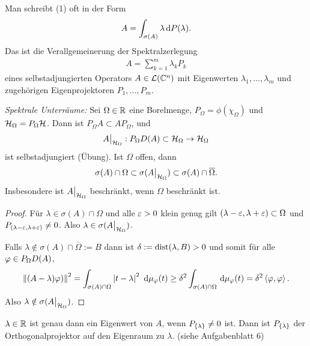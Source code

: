 \begin{bem*}[Bemerkungen.]
\begin{bemenum}
\item Man schreibt (1) oft in der Form
\begin{align*}
A = \int_{\sigma(A)} \lambda \,\mathrm{d} P(\lambda).
\end{align*}
Das ist die Verallgemeinerung der Spektralzerlegung
\begin{align*}
A = \sum_{k=1}^m \lambda_k P_k
\end{align*}
eines selbstadjungierten Operators $A\in\mathcal{L}(\mathbb{C}^n)$ mit Eigenwerten
$\lambda_1,\ldots,\lambda_m$ und zugehörigen Eigenprojektoren $P_1,\ldots,P_m$.

\item
\emph{Spektrale Unterräume:}
Sei $\Omega \in \mathbb{R}$ eine Borelmenge,
$P_{\Omega} = \phi(\chi_{\Omega})$ und $\mathcal{H}_{\Omega} = P_{\Omega}\mathcal{H}$.
Dann ist $P_{\Omega}A \subset AP_{\Omega}$, und
\begin{align*}
A\big|_{\mathcal{H}_{\Omega}} : P_{\Omega} D(A) \subset \mathcal{H}_{\Omega}
\to \mathcal{H}_{\Omega}
\end{align*}
ist selbstadjungiert (Übung). Ist $\Omega$ offen, dann
\begin{align*}
\sigma(A)\cap\Omega\subset\sigma(A\big|_{\mathcal{H}_{\Omega}}) \subset
\sigma(A)\cap\overline{\Omega}.
\end{align*}
Insbesondere ist $A \big|_{\mathcal{H}_{\Omega}}$
beschränkt, wenn $\Omega$ beschränkt ist.
\begin{proof}
Für $\lambda\in \sigma(A)\cap\Omega$ und alle $\varepsilon>0$ klein genug
gilt $(\lambda-\varepsilon,\lambda+\varepsilon)\subset\Omega$ und
$P_{(\lambda-\varepsilon,\lambda+\varepsilon)}\neq 0$. Also
$\lambda\in\sigma(A\big|_{\mathcal{H}_{\Omega}})$.

Falls $\lambda \notin\sigma(A) \cap\overline{\Omega} := B$
dann ist $\delta := \mathrm{dist}(\lambda, B) > 0$ und somit
für alle $\varphi\in P_{\Omega} D(A)$,
\begin{align*}
\left\|(A - \lambda)\varphi)\right\|^2
=\int_{\sigma(A) \cap \Omega}\left|t-\lambda\right|^2 \, \,\mathrm{d} \mu_{\varphi}(t)
\geq \delta^2 \int_{\sigma(A) \cap \Omega} \,\mathrm{d} \mu_{\varphi}(t)
= \delta^2 \left\langle\varphi,\varphi\right\rangle.
\end{align*}
Also $\lambda\notin \sigma(A\big|_{\mathcal{H}_{\Omega}})$.\qedhere
\end{proof}

\item
$\lambda \in \mathbb{R}$ ist genau dann ein Eigenwert von $A$,
wenn $P_{\left\{ \lambda \right\}} \ne 0$ ist.
Dann ist $P_{\left\{ \lambda \right\}}$ der Orthogonalprojektor auf den Eigenraum
zu $\lambda$. (siehe Aufgabenblatt 6)


\end{bemenum}
\end{bem*}
